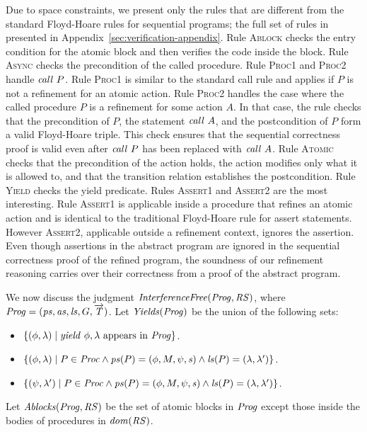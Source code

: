 Due to space constraints, we present only the rules that are different from the standard Floyd-Hoare rules for sequential programs;
the full set of rules in presented in Appendix~\ref{sec:verification-appendix}.
Rule \textsc{Ablock} checks the entry condition for the atomic block and then verifies 
the code inside the block.
Rule \textsc{Async} checks the precondition of the called procedure.
Rule \textsc{Proc1} and \textsc{Proc2} handle $\mathit{call}\ P$.  
Rule \textsc{Proc1} is similar to the standard call rule and applies if $P$ is not a refinement for an atomic action.
Rule \textsc{Proc2} handles the case where the called procedure $P$ is a refinement for some action $A$.
In that case, the rule checks that the precondition of $P$, the statement $\mathit{call}\ A$, and the postcondition of $P$
form a valid Floyd-Hoare triple.
This check ensures that the sequential correctness proof is valid even after $\mathit{call}\ P$ has been replaced with $\mathit{call}\ A$.
Rule \textsc{Atomic} checks that the precondition of the action holds, the action modifies only what it is allowed to,
and that the transition relation establishes the postcondition.
Rule \textsc{Yield} checks the yield predicate.
Rules \textsc{Assert1} and \textsc{Assert2} are the most interesting.
Rule \textsc{Assert1} is applicable inside a procedure that refines an atomic action 
and is identical to the traditional Floyd-Hoare rule for assert statements.
However \textsc{Assert2}, applicable outside a refinement context, ignores the assertion.
Even though assertions in the abstract program are ignored in the sequential correctness proof of the refined program,
the soundness of our refinement reasoning carries over their correctness from a proof of the abstract program.

We now discuss the judgment $\mathit{InterferenceFree}(\mathit{Prog},\mathit{RS})$,
where $\mathit{Prog} = (\mathit{ps}, \mathit{as}, \mathit{ls}, G, \overrightarrow{\mathit{T}})$. 
Let $\mathit{Yields}(\mathit{Prog})$ be the union of the following sets:
\begin{itemize}
\item
$\{(\phi,\lambda) \mid \mathit{yield}\ \phi,\lambda~\mathrm{appears~in~\mathit{Prog}}\}$.
\item
$\{(\phi,\lambda) \mid P \in \mathit{Proc} \wedge \mathit{ps}(P) = (\phi, M, \psi, \mathit{s}) \wedge \mathit{ls}(P) = (\lambda,\lambda')\}$.
\item
$\{(\psi,\lambda') \mid P \in \mathit{Proc} \wedge \mathit{ps}(P) = (\phi, M, \psi, \mathit{s}) \wedge \mathit{ls}(P) = (\lambda,\lambda')\}$.
\end{itemize}
Let $\mathit{Ablocks}(\mathit{Prog},\mathit{RS})$ be the set of atomic blocks in $\mathit{Prog}$ except those inside the bodies of procedures
in $\mathit{dom}(\mathit{RS})$.

